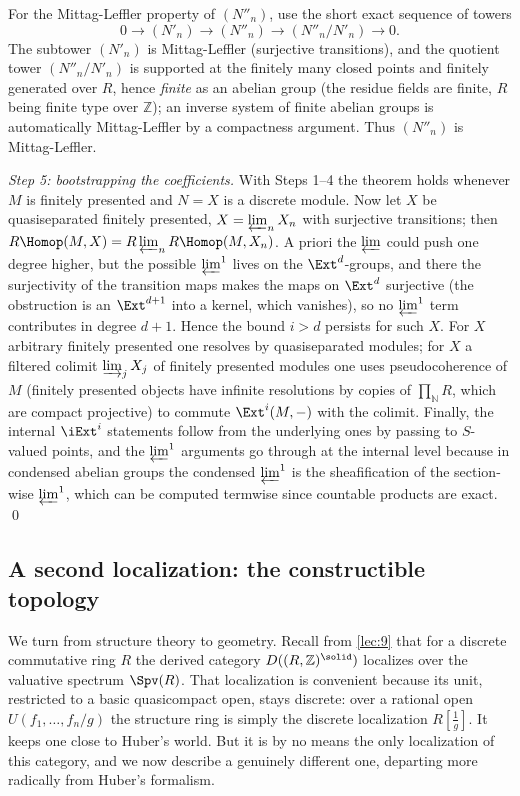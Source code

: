 For the Mittag-Leffler property of $(N''_{n})$, use the short exact sequence of
towers
\begin{equation*}
0\to (N'_{n})\to (N''_{n})\to (N''_{n}/N'_{n})\to 0.
\end{equation*}
The subtower $(N'_{n})$ is Mittag-Leffler (surjective transitions), and the
quotient tower $(N''_{n}/N'_{n})$ is supported at the finitely many closed
points and finitely generated over $R$, hence \emph{finite} as an abelian group
(the residue fields are finite, $R$ being finite type over $\mathbb{Z}$); an
inverse system of finite abelian groups is automatically Mittag-Leffler by a
compactness argument. Thus $(N''_{n})$ is Mittag-Leffler.

\emph{Step 5: bootstrapping the coefficients.} With Steps 1--4 the theorem holds
whenever $M$ is finitely presented and $N=X$ is a discrete module. Now let $X$
be quasiseparated finitely presented, $X=\varprojlim_{n}X_{n}$ with surjective
transitions; then $R\Homop(M,X)=R\varprojlim_{n}R\Homop(M,X_{n})$. A priori the
$\varprojlim$ could push one degree higher, but the possible $\varprojlim^{1}$
lives on the $\Ext^{d}$-groups, and there the surjectivity of the transition
maps makes the maps on $\Ext^{d}$ surjective (the obstruction is an
$\Ext^{d+1}$ into a kernel, which vanishes), so no $\varprojlim^{1}$ term
contributes in degree $d+1$. Hence the bound $i>d$ persists for such $X$. For
$X$ arbitrary finitely presented one resolves by quasiseparated modules; for
$X$ a filtered colimit $\varinjlim_{j}X_{j}$ of finitely presented modules one
uses pseudocoherence of $M$ (finitely presented objects have infinite
resolutions by copies of $\prod_{\mathbb{N}}R$, which are compact projective) to
commute $\Ext^{i}(M,-)$ with the colimit. Finally, the internal $\iExt^{i}$
statements follow from the underlying ones by passing to $S$-valued points, and
the $\varprojlim^{1}$ arguments go through at the internal level because in
condensed abelian groups the condensed $\varprojlim^{1}$ is the sheafification
of the section-wise $\varprojlim^{1}$, which can be computed termwise since
countable products are exact. \qed

\subsection{A second localization: the constructible topology}

We turn from structure theory to geometry. Recall from \cref{lec:9} that for a
discrete commutative ring $R$ the derived category $D((R,\mathbb{Z})^{\solid})$
localizes over the valuative spectrum $\Spv(R)$. That localization is convenient
because its unit, restricted to a basic quasicompact open, stays discrete: over
a rational open $U(f_{1},\dots,f_{n}/g)$ the structure ring is simply the
discrete localization $R[\tfrac1g]$. It keeps one close to Huber's world. But it
is by no means the only localization of this category, and we now describe a
genuinely different one, departing more radically from Huber's formalism.

